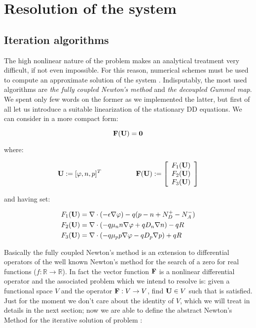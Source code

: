 \chapter{Resolution of the system}

\section{Iteration algorithms}

The high nonlinear nature of the problem 	makes an analytical treatment very difficult, if not even impossible. For this reason, numerical schemes must be used to compute an approximate solution of the system . Indisputably, the most used algorithms are \textit{the fully coupled Newton's method} and \textit{the decoupled Gummel map}. We spent only few words on the former as we implemented the latter, but first of all let us introduce a suitable linearization of the stationary DD equations. We can consider  in a more compact form:

\begin{equation}
\label{eq: abstract problem fully}
\mathbf{F(U)}=\mathbf{0}
\end{equation}

where:

\begin{equation}
\vect{U}:=[\varphi,n,p]^T \psp{30} \vect{F(U)}:=\left[ \begin{array}{c}
F_1(\vect{U}) \\
F_2(\vect{U}) \\
F_3(\vect{U})
\end{array}
\right]
\end{equation}

and having set:

\begin{align*}
F_1(\mathbf{U}) & = \nabla \cdot (-\epsilon \nabla \varphi) - q(p-n+N_D^+-N_A^-) \\
F_2(\mathbf{U}) & = \nabla \cdot ( - q\mu_n n \nabla \varphi + qD_n \nabla n )-qR \\
F_3(\mathbf{U}) & = \nabla \cdot (- q\mu_p p \nabla \varphi - qD_p \nabla p )+qR
\end{align*}

\vspace{0.1cm}

Basically the fully coupled Newton's method is an extension to differential operators of the well known Newton's method for the search of a zero for real functions ($f:\mathbb{R}\rightarrow \mathbb{R}$). In fact the vector function $\mathbf{F}$ is a nonlinear differential operator and the associated problem which we intend to resolve is: given a functional space $V$ and the operator $\mathbf{F}:V\rightarrow V$, find $\mathbf{U}\in V$ such that  is satisfied.
Just for the moment we don't care about the identity of $V$, which we will treat in details in the next section; now we are able to define  the abstract Newton's Method for the iterative solution of problem :

